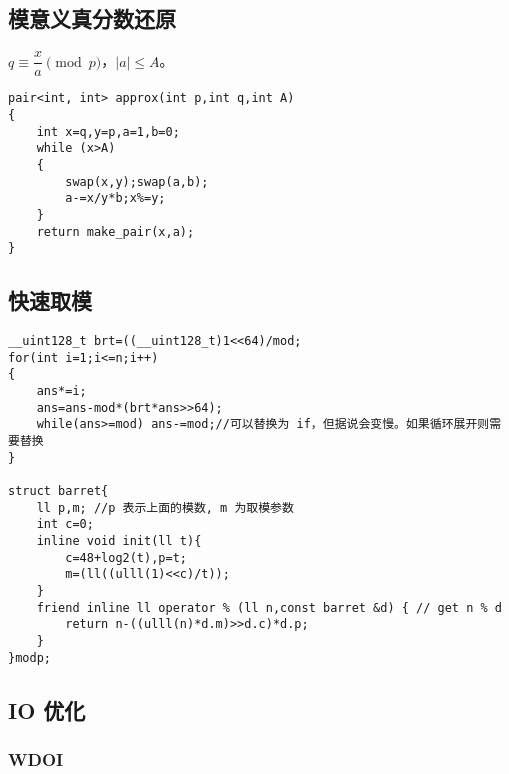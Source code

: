 \documentclass[12pt]{ctexart}
\begin{document}
\subsection{模意义真分数还原}

$q\equiv \dfrac{x}{a}\pmod p$，$|a|\le A$。

\begin{lstlisting}
pair<int, int> approx(int p,int q,int A)
{
	int x=q,y=p,a=1,b=0;
	while (x>A)
	{
		swap(x,y);swap(a,b);
		a-=x/y*b;x%=y;
	}
	return make_pair(x,a);
}
\end{lstlisting}

\subsection{快速取模}

\begin{lstlisting}
__uint128_t brt=((__uint128_t)1<<64)/mod;
for(int i=1;i<=n;i++)
{
	ans*=i;
	ans=ans-mod*(brt*ans>>64);
	while(ans>=mod) ans-=mod;//可以替换为 if，但据说会变慢。如果循环展开则需要替换
}

struct barret{
    ll p,m; //p 表示上面的模数, m 为取模参数
    int c=0;
    inline void init(ll t){
    	c=48+log2(t),p=t;
		m=(ll((ulll(1)<<c)/t));
	}
    friend inline ll operator % (ll n,const barret &d) { // get n % d
        return n-((ulll(n)*d.m)>>d.c)*d.p;
    }
}modp;
\end{lstlisting}

\subsection{IO 优化}

\subsubsection{WDOI}
\end{document}
